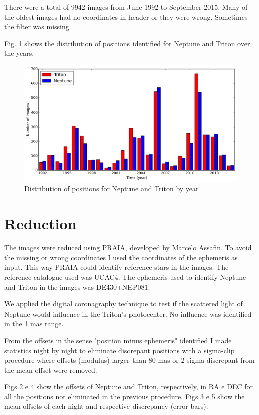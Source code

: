 \documentclass[12pt,a4paper]{report}
\begin{document}
There were a total of 9942 images from June 1992 to September 2015. Many of the oldest images had no coordinates in header or they were wrong. Sometimes the filter was missing.

Fig. 1 shows the distribution of positions identified for Neptune and Triton over the years.

\begin{figure}[h]
\includegraphics[width=16.0cm]{pos-distribution.png} 
\caption{Distribution of positions for Neptune and Triton by year}
\label{Fig:pos-dist}
\end{figure}


\section*{Reduction}

The images were reduced using PRAIA, developed by Marcelo Assafin. To avoid the missing or wrong coordinates I used the coordinates of the ephemeris as input. This way PRAIA could identify reference stars in the images. The reference catalogue used was UCAC4. The ephemeris used to identify Neptune and Triton in the images was DE430+NEP081.

We applied the digital coronagraphy technique to test if the scattered light of Neptune would influence in the Triton's photocenter. No influence was identified in the 1 mas range.

From the offsets in the sense "position minus ephemeris" identified I made statistics night by night to eliminate discrepant positions with a sigma-clip procedure where offsets (modulus) larger than 80 mas or 2-sigma discrepant from the mean offset were removed.

Figs 2 e 4 show the offsets of Neptune and Triton, respectively, in RA e DEC for all the positions not eliminated in the previous procedure. Figs 3 e 5 show the mean offsets of each night and respective discrepancy (error bars).
\end{document}
